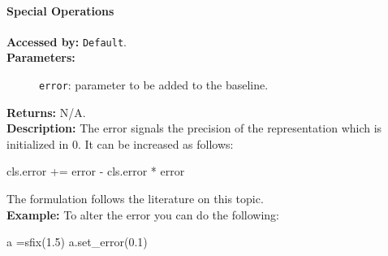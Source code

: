 		\paragraph{Special Operations}

		
			\textbf{Accessed by:} \verb|Default|.		 \\
			\textbf{Parameters:}
			\begin{description}
				\item[]\verb|error|:  parameter to be added to the baseline. 
			\end{description}
			\textbf{Returns:} N/A. \\
			\textbf{Description:} The error signals the precision of the representation which is initialized in 0. It can be increased as follows:
			\begin{mylisting}							
					cls.error += error - cls.error * error
			\end{mylisting}
			The formulation follows the literature on this topic. \\
			\textbf{Example:}      
			To alter the error you can do the following:
			\begin{mylisting}
				a =sfix(1.5)
				a.set_error(0.1)
			\end{mylisting}
		
